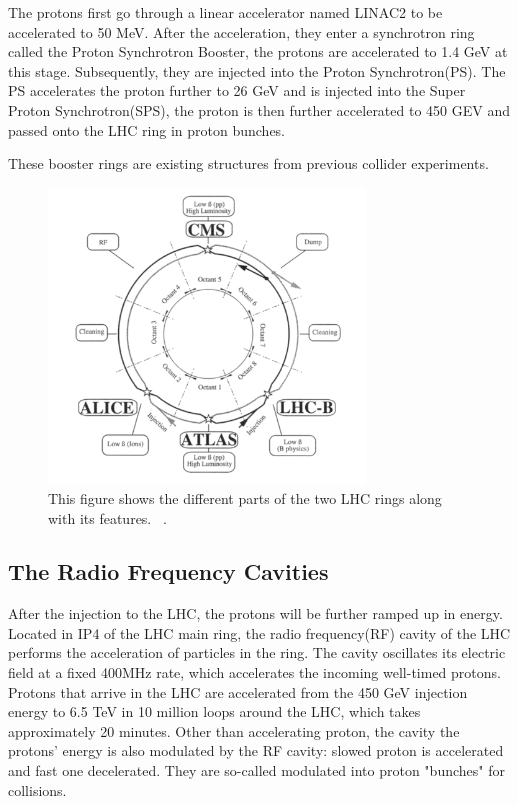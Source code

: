 The protons first go through a linear accelerator named LINAC2 to be accelerated to 50 MeV. After the acceleration, they enter a synchrotron ring called the Proton Synchrotron Booster, the protons are accelerated to 1.4 GeV at this stage. Subsequently, they are injected into the Proton Synchrotron(PS). The PS accelerates the proton further to 26 GeV and is injected into the Super Proton Synchrotron(SPS), the proton is then further accelerated to 450 GEV and passed onto the LHC ring in
proton bunches.  

These booster rings are existing structures from previous collider experiments.

\begin{figure}[!htb]
    \begin{center}
        \includegraphics[width=0.75\textwidth]{figures/chapter_ATLAS/LHCRing}
        \caption{
			This figure shows the different parts of the two LHC rings along with its features. ~\cite{Pettersson:291782}.
        }
        \label{fig:perterson}
    \end{center}
\end{figure}

\subsection*{The Radio Frequency Cavities}
After the injection to the LHC, the protons will be further ramped up in energy. Located in IP4 of the LHC main ring, the radio frequency(RF) cavity of the LHC performs the acceleration of particles in the ring. The cavity oscillates its electric field at a fixed 400MHz rate, which accelerates the incoming well-timed protons. Protons that arrive in the LHC are accelerated from the 450 GeV injection energy to 6.5 TeV in 10 million loops around the LHC, which takes approximately 20 minutes. Other
than accelerating proton, the cavity the protons'
energy is also modulated by the RF cavity: slowed proton is accelerated and fast one decelerated. They are so-called modulated into proton "bunches" for collisions. 

